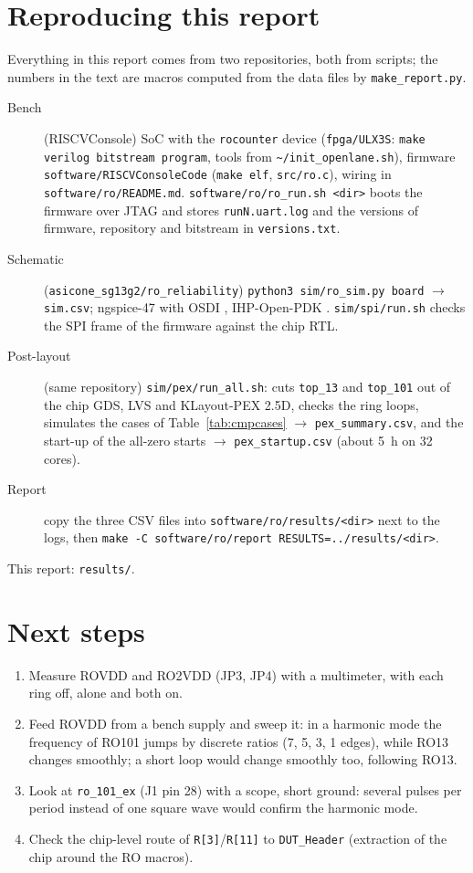 \section{Reproducing this report}
\label{sec:repro}
Everything in this report comes from two repositories, both from scripts; the numbers in the text are
macros computed from the data files by \texttt{make\_report.py}.
\begin{description}
  \item[Bench] (RISCVConsole) SoC with the \texttt{rocounter} device (\texttt{fpga/ULX3S}:
        \texttt{make verilog bitstream program}, tools from \texttt{\textasciitilde/init\_openlane.sh}),
        firmware \texttt{software/RISCVConsoleCode} (\texttt{make elf}, \texttt{src/ro.c}), wiring in
        \texttt{software/ro/README.md}. \texttt{software/ro/ro\_run.sh <dir>} boots the firmware over
        JTAG and stores \texttt{runN.uart.log} and the versions of firmware, repository and bitstream
        in \texttt{versions.txt}.
  \item[Schematic] (\texttt{asicone\_sg13g2/ro\_reliability}) \texttt{python3 sim/ro\_sim.py board}
        $\rightarrow$ \texttt{sim.csv}; ngspice-47 with OSDI \cite{ngspice}, IHP-Open-PDK \cite{ihppdk}.
        \texttt{sim/spi/run.sh} checks the SPI frame of the firmware against the chip RTL.
  \item[Post-layout] (same repository) \texttt{sim/pex/run\_all.sh}: cuts \texttt{top\_13} and
        \texttt{top\_101} out of the chip GDS, LVS and KLayout-PEX 2.5D, checks the ring loops,
        simulates the cases of Table~\ref{tab:cmpcases} $\rightarrow$ \texttt{pex\_summary.csv}, and
        the start-up of the all-zero starts $\rightarrow$ \texttt{pex\_startup.csv}
        (about \SI{5}{h} on 32 cores).
  \item[Report] copy the three CSV files into \texttt{software/ro/results/<dir>} next to the logs, then
        \texttt{make -C software/ro/report RESULTS=../results/<dir>}.
\end{description}
This report: \texttt{results/\ResultsDir}.

\section{Next steps}
\begin{enumerate}
  \item Measure ROVDD and RO2VDD (JP3, JP4) with a multimeter, with each ring off, alone and both on.
  \item Feed ROVDD from a bench supply and sweep it: in a harmonic mode the frequency of RO101 jumps by
        discrete ratios (7, 5, 3, 1 edges), while RO13 changes smoothly; a short loop would change smoothly
        too, following RO13.
  \item Look at \texttt{ro\_101\_ex} (J1 pin 28) with a scope, short ground: several pulses per period
        instead of one square wave would confirm the harmonic mode.
  \item Check the chip-level route of \texttt{R[3]}/\texttt{R[11]} to \texttt{DUT\_Header} (extraction of
        the chip around the RO macros).
\end{enumerate}
